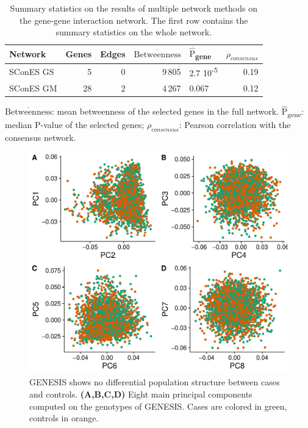 \documentclass[twocolumn, 11pt]{article}
\newcommand{\mean}[1]{$\overline{\mbox{#1}}$}
\newcommand{\median}[1]{$\hat{\mbox{#1}}$}
\begin{document}
\begin{table}[htbp]
\begin{threeparttable}
  \caption{\label{tab:scones_gene_solutions}
Summary statistics on the results of multiple network methods on the gene-gene interaction network. The first row contains the summary statistics on the whole network.}
\centering
\begin{tabular}{lrrrlr}
Network & Genes & Edges & \mean{Betweenness} & \median{P}\textsubscript{gene} & $\rho_{consensus}$\\
\hline
SConES GS & 5 & 0 & 9\,805 & 2.7 \texttimes{} 10\textsuperscript{-5} & 0.19\\
SConES GM & 28 & 2 & 4\,267 & 0.067 & 0.12\\
\end{tabular}
\begin{tablenotes}
  \footnotesize{
    \item \mean{Betweenness}: mean betweenness of the selected genes in the full network. \median{P}\textsubscript{gene}: median P-value of the selected genes; $\rho_{consensus}$: Pearson correlation with the consensus network.
  }
\end{tablenotes}
\end{threeparttable}
\end{table}

\begin{figure}[htbp]
\centering
\includegraphics[width=.9\linewidth]{./figures/sfigure_1.pdf}
\caption{\label{sfig:pcs} GENESIS shows no differential population structure between cases and controls. \textbf{(A,B,C,D)} Eight main principal components computed on the genotypes of GENESIS. Cases are colored in green, controls in orange.}
\end{figure}
\end{document}
